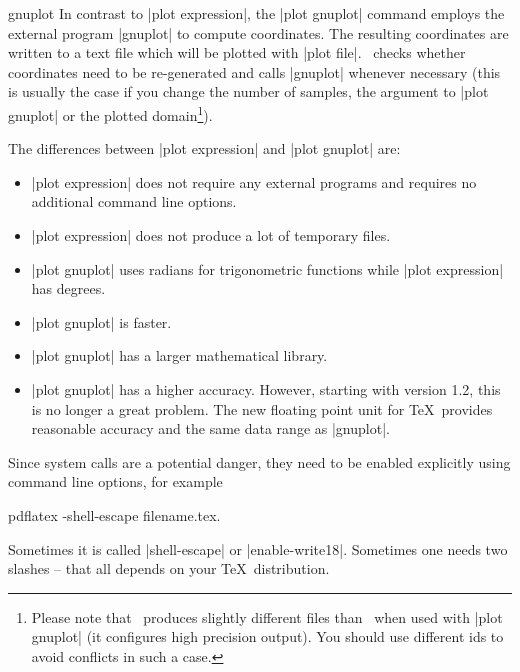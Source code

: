 \begin{addplotoperation}[]{gnuplot}{}
In contrast to |plot expression|, the |plot gnuplot| command employs the external program |gnuplot| to compute coordinates. The resulting coordinates are written to a text file which will be plotted with |plot file|. \PGF\ checks whether coordinates need to be re-generated and calls |gnuplot| whenever necessary (this is usually the case if you change the number of samples, the argument to |plot gnuplot| or the plotted domain\footnote{Please note that \PGFPlots\ produces slightly different files than \Tikz\ when used with |plot gnuplot| (it configures high precision output). You should use different ids to avoid conflicts in such a case.}).

The differences between |plot expression| and |plot gnuplot| are:
\begin{itemize}
	\item |plot expression| does not require any external programs and requires no additional command line options.
	\item |plot expression| does not produce a lot of temporary files.
	\item |plot gnuplot| uses radians for trigonometric functions while |plot expression| has degrees.
	\item |plot gnuplot| is faster.
	\item |plot gnuplot| has a larger mathematical library.
	\item |plot gnuplot| has a higher accuracy. However, starting with version 1.2, this is no longer a great problem. The new floating point unit for \TeX\ provides reasonable accuracy and the same data range as |gnuplot|.
\end{itemize}

Since system calls are a potential danger, they need to be enabled explicitly using command line options, for example
\begin{codeexample}
pdflatex -shell-escape filename.tex.
\end{codeexample}
Sometimes it is called |shell-escape| or |enable-write18|. Sometimes one needs two slashes -- that all depends on your \TeX\ distribution.
\begin{codeexample}[]
\end{codeexample}


\end{addplotoperation}

